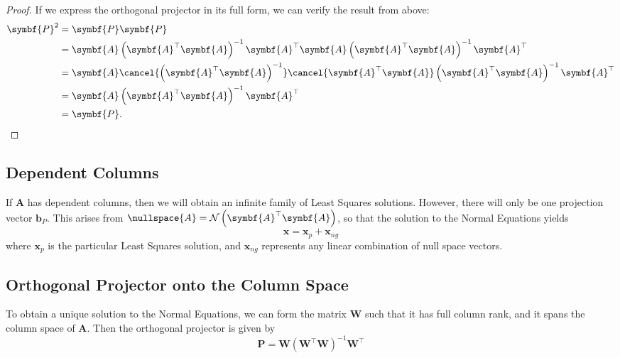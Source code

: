 \documentclass{article}
\begin{document}
\begin{proof}
    If we express the orthogonal projector in its full form, we can verify the result from above:
    \begin{align*}
        \symbf{P}^2 & = \symbf{P} \symbf{P}                                                                                                                                           \\
                    & = \symbf{A} \left( \symbf{A}^\top \symbf{A} \right)^{-1} \symbf{A}^\top \symbf{A} \left( \symbf{A}^\top \symbf{A} \right)^{-1} \symbf{A}^\top                   \\
                    & = \symbf{A} \cancel{\left( \symbf{A}^\top \symbf{A} \right)^{-1}} \cancel{\symbf{A}^\top \symbf{A}} \left( \symbf{A}^\top \symbf{A} \right)^{-1} \symbf{A}^\top \\
                    & = \symbf{A} \left( \symbf{A}^\top \symbf{A} \right)^{-1} \symbf{A}^\top                                                                                         \\
                    & = \symbf{P}.
    \end{align*}
\end{proof}
\subsection{Dependent Columns}
If \(\symbf{A}\) has dependent columns, then we will obtain an infinite
family of Least Squares solutions. However, there will only be one
projection vector \(\symbf{b}_P\).
This arises from \(\nullspace{A} = \mathcal{N}\left(\symbf{A}^\top
\symbf{A}\right)\), so that the solution to the Normal Equations yields
\begin{equation*}
    \symbf{x} = \symbf{x}_p + \symbf{x}_{ng}
\end{equation*}
where \(\symbf{x}_p\) is the particular Least Squares solution, and \(\symbf{x}_{ng}\) represents
any linear combination of null space vectors.
\subsection{Orthogonal Projector onto the Column Space}
To obtain a unique solution to the Normal Equations, we can form the
matrix \(\symbf{W}\) such that it has full column rank, and it spans the
column space of \(\symbf{A}\). Then the orthogonal projector is given
by
\begin{equation*}
    \symbf{P} = \symbf{W} \left( \symbf{W}^\top \symbf{W} \right)^{-1} \symbf{W}^\top
\end{equation*}
\end{document}
